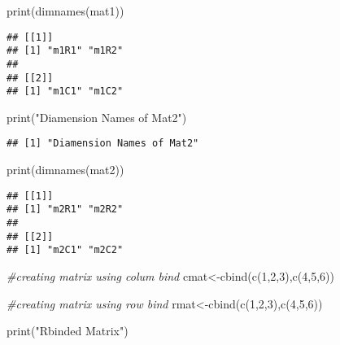 \documentclass[
]{article}
\newenvironment{Shaded}{\begin{snugshade}}{\end{snugshade}}
\newcommand{\CommentTok}[1]{\textcolor[rgb]{0.56,0.35,0.01}{\textit{#1}}}
\newcommand{\DecValTok}[1]{\textcolor[rgb]{0.00,0.00,0.81}{#1}}
\newcommand{\FunctionTok}[1]{\textcolor[rgb]{0.00,0.00,0.00}{#1}}
\newcommand{\NormalTok}[1]{#1}
\newcommand{\OtherTok}[1]{\textcolor[rgb]{0.56,0.35,0.01}{#1}}
\newcommand{\StringTok}[1]{\textcolor[rgb]{0.31,0.60,0.02}{#1}}
\begin{document}
\begin{Shaded}
\begin{Highlighting}[]
\FunctionTok{print}\NormalTok{(}\FunctionTok{dimnames}\NormalTok{(mat1))}
\end{Highlighting}
\end{Shaded}

\begin{verbatim}
## [[1]]
## [1] "m1R1" "m1R2"
## 
## [[2]]
## [1] "m1C1" "m1C2"
\end{verbatim}

\begin{Shaded}
\begin{Highlighting}[]
\FunctionTok{print}\NormalTok{(}\StringTok{"Diamension Names of Mat2"}\NormalTok{)}
\end{Highlighting}
\end{Shaded}

\begin{verbatim}
## [1] "Diamension Names of Mat2"
\end{verbatim}

\begin{Shaded}
\begin{Highlighting}[]
\FunctionTok{print}\NormalTok{(}\FunctionTok{dimnames}\NormalTok{(mat2))}
\end{Highlighting}
\end{Shaded}

\begin{verbatim}
## [[1]]
## [1] "m2R1" "m2R2"
## 
## [[2]]
## [1] "m2C1" "m2C2"
\end{verbatim}

\begin{Shaded}
\begin{Highlighting}[]
\CommentTok{\#creating matrix using colum bind}
\NormalTok{cmat}\OtherTok{\textless{}{-}}\FunctionTok{cbind}\NormalTok{(}\FunctionTok{c}\NormalTok{(}\DecValTok{1}\NormalTok{,}\DecValTok{2}\NormalTok{,}\DecValTok{3}\NormalTok{),}\FunctionTok{c}\NormalTok{(}\DecValTok{4}\NormalTok{,}\DecValTok{5}\NormalTok{,}\DecValTok{6}\NormalTok{))}

\CommentTok{\#creating matrix using row bind}
\NormalTok{rmat}\OtherTok{\textless{}{-}}\FunctionTok{cbind}\NormalTok{(}\FunctionTok{c}\NormalTok{(}\DecValTok{1}\NormalTok{,}\DecValTok{2}\NormalTok{,}\DecValTok{3}\NormalTok{),}\FunctionTok{c}\NormalTok{(}\DecValTok{4}\NormalTok{,}\DecValTok{5}\NormalTok{,}\DecValTok{6}\NormalTok{))}

\FunctionTok{print}\NormalTok{(}\StringTok{"Rbinded Matrix"}\NormalTok{)}
\end{Highlighting}
\end{Shaded}
\end{document}
